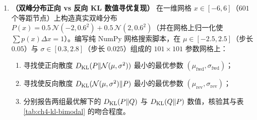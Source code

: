 \begin{enumerate}[label=\textbf{4.\arabic*}, leftmargin=2.4em, resume]
  \item \textbf{（双峰分布正向 vs 反向 KL 数值寻优复现）} 在一维网格 $x \in [-6, 6]$（$601$ 个等距节点）上构造真实双峰分布 $P(x) = 0.5\,\mathcal{N}(-2, 0.6^2) + 0.5\,\mathcal{N}(2, 0.6^2)$（并在网格上归一化使 $\sum p(x)\Delta x = 1$）。编写纯 NumPy 网格搜索脚本，在 $\mu \in [-2.5, 2.5]$（步长 $0.05$）与 $\sigma \in [0.3, 2.8]$（步长 $0.025$）组成的 $101 \times 101$ 参数网格上：
  \begin{enumerate}[label=(\arabic*), leftmargin=1.8em]
    \item 寻找使正向散度 $D_{\mathrm{KL}}(P \| \mathcal{N}(\mu, \sigma^2))$ 最小的最优参数 $(\mu_{\mathrm{fwd}}, \sigma_{\mathrm{fwd}})$；
    \item 寻找使反向散度 $D_{\mathrm{KL}}(\mathcal{N}(\mu, \sigma^2) \| P)$ 最小的最优参数 $(\mu_{\mathrm{rev}}, \sigma_{\mathrm{rev}})$；
    \item 分别报告两组最优解下的 $D_{\mathrm{KL}}(P\|Q)$ 与 $D_{\mathrm{KL}}(Q\|P)$ 数值，核验其与表 \ref{tab:ch4-kl-bimodal} 的吻合程度。
  \end{enumerate}
  \par\smallskip{}
\end{enumerate}
